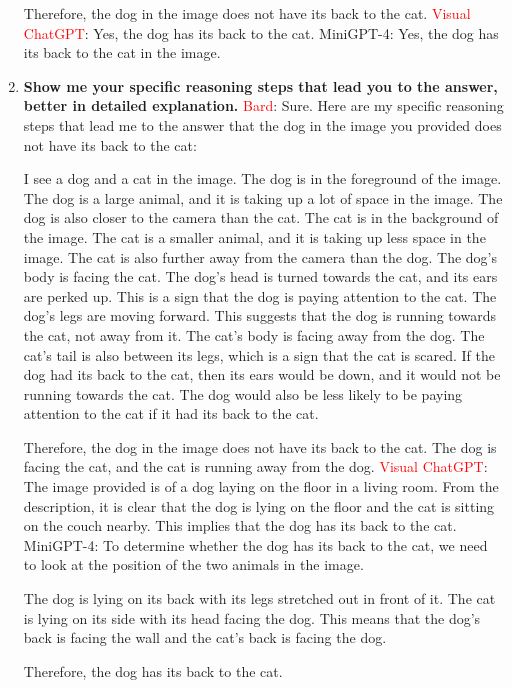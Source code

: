 \begin{enumerate}
    Therefore, the dog in the image does not have its back to the cat.
    \subitem \textcolor{red}{Visual ChatGPT}: Yes, the dog has its back to the cat.
    \subitem MiniGPT-4: Yes, the dog has its back to the cat in the image.
    \item \textbf{Show me your specific reasoning steps that lead you to the answer, better in detailed explanation.}
    \subitem \textcolor{Red}{Bard}: Sure. Here are my specific reasoning steps that lead me to the answer that the dog in the image you provided does not have its back to the cat:

    I see a dog and a cat in the image.
    The dog is in the foreground of the image. The dog is a large animal, and it is taking up a lot of space in the image. The dog is also closer to the camera than the cat.
    The cat is in the background of the image. The cat is a smaller animal, and it is taking up less space in the image. The cat is also further away from the camera than the dog.
    The dog's body is facing the cat. The dog's head is turned towards the cat, and its ears are perked up. This is a sign that the dog is paying attention to the cat.
    The dog's legs are moving forward. This suggests that the dog is running towards the cat, not away from it.
    The cat's body is facing away from the dog. The cat's tail is also between its legs, which is a sign that the cat is scared.
    If the dog had its back to the cat, then its ears would be down, and it would not be running towards the cat. The dog would also be less likely to be paying attention to the cat if it had its back to the cat.
    
    Therefore, the dog in the image does not have its back to the cat.
    The dog is facing the cat, and the cat is running away from the dog.
    \subitem \textcolor{red}{Visual ChatGPT}: The image provided is of a dog laying on the floor in a living room. From the description, it is clear that the dog is lying on the floor and the cat is sitting on the couch nearby. This implies that the dog has its back to the cat.
    \subitem MiniGPT-4: To determine whether the dog has its back to the cat, we need to look at the position of the two animals in the image.

    The dog is lying on its back with its legs stretched out in front of it. The cat is lying on its side with its head facing the dog. This means that the dog’s back is facing the wall and the cat’s back is facing the dog.
    
    Therefore, the dog has its back to the cat.
\end{enumerate}
